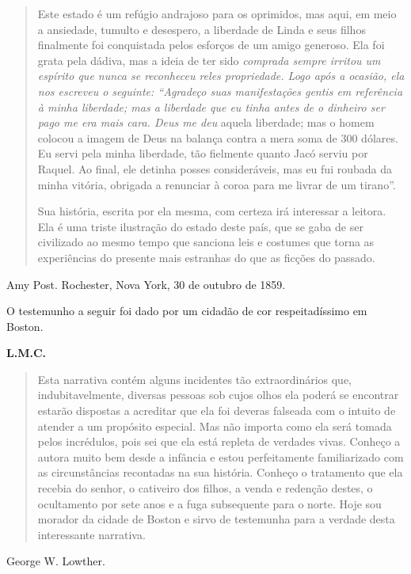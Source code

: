 \begin{quote}
Este estado é um refúgio andrajoso para
os oprimidos, mas aqui, em meio a ansiedade, tumulto e desespero, a
liberdade de Linda e seus filhos finalmente foi conquistada pelos
esforços de um amigo generoso. Ela foi grata pela dádiva, mas a ideia de
ter sido \emph{comprada sempre irritou um espírito que nunca se
reconheceu reles propriedade. Logo após a ocasião, ela nos escreveu o
seguinte: ``Agradeço suas manifestações gentis em referência à minha
liberdade; mas a liberdade que eu tinha antes de o dinheiro ser pago me
era mais cara. Deus me deu} aquela liberdade; mas o homem colocou a
imagem de Deus na balança contra a mera soma de 300 dólares. Eu servi
pela minha liberdade, tão fielmente quanto Jacó serviu por Raquel. Ao
final, ele detinha posses consideráveis, mas eu fui roubada da minha
vitória, obrigada a renunciar à coroa para me livrar de um tirano''.

Sua história, escrita por ela mesma,
com certeza irá interessar a leitora. Ela é uma triste ilustração do
estado deste país, que se gaba de ser civilizado ao mesmo tempo que
sanciona leis e costumes que torna as experiências do presente mais
estranhas do que as ficções do passado.
\end{quote}

Amy Post. Rochester, Nova York, 30 de
outubro de 1859.

O testemunho a seguir foi dado por um
cidadão de cor respeitadíssimo em Boston.

\textbf{L.M.C.}

\begin{quote}
Esta narrativa contém alguns incidentes
tão extraordinários que, indubitavelmente, diversas pessoas sob cujos
olhos ela poderá se encontrar estarão dispostas a acreditar que ela foi
deveras falseada com o intuito de atender a um propósito especial. Mas
não importa como ela será tomada pelos incrédulos, pois sei que ela está
repleta de verdades vivas. Conheço a autora muito bem desde a infância e
estou perfeitamente familiarizado com as circunstâncias recontadas na
sua história. Conheço o tratamento que ela recebia do senhor, o
cativeiro dos filhos, a venda e redenção destes, o ocultamento por sete
anos e a fuga subsequente para o norte. Hoje sou morador da cidade de
Boston e sirvo de testemunha para a verdade desta interessante
narrativa.
\end{quote}

George W. Lowther.
